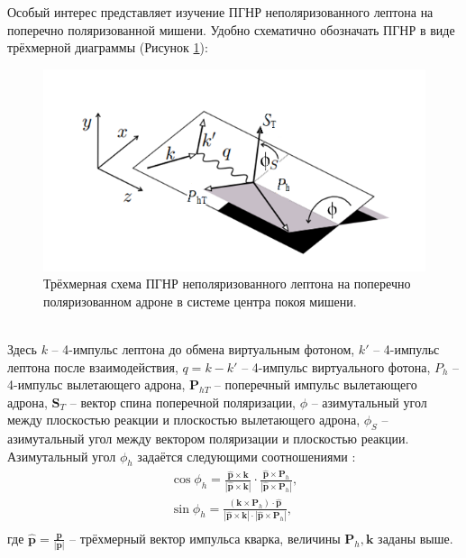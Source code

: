 \documentclass{extarticle}
\begin{document}
Особый интерес представляет изучение ПГНР неполяризованного лептона на поперечно поляризованной мишени. Удобно схематично обозначать ПГНР в виде трёхмерной диаграммы (Рисунок \ref{fig:sidis}):
\begin{figure}[h]
	\centering
	\includegraphics{sidis.png}
	\caption{Трёхмерная схема ПГНР неполяризованного лептона на поперечно поляризованном адроне в системе центра покоя мишени.}
	\label{fig:sidis}
\end{figure} \\
Здесь $k$ -- 4-импульс лептона до обмена виртуальным фотоном, $k'$ -- 4-импульс лептона после взаимодействия, $q = k-k'$ -- 4-импульс виртуального фотона, $P_h$ -- 4-импульс вылетающего адрона, $\textbf{P}_{hT}$ -- поперечный импульс вылетающего адрона, $\textbf{S}_T$ -- вектор спина поперечной поляризации, $\phi$ -- азимутальный угол между плоскостью реакции и плоскостью вылетающего адрона, $\phi_S$ -- азимутальный угол между вектором поляризации и плоскостью реакции. Азимутальный угол $\phi_h$ задаётся следующими соотношениями \cite{Bacchetta_2004}:
\begin{equation}
	\begin{split}
		\cos \phi_{h} = \frac{\hat{\textbf{p}} \times \textbf{k}}{|\hat{\textbf{p}} \times \textbf{k}|} \cdot \frac{\hat{\textbf{p}}\times \textbf{P}_h}{|\hat{\textbf{p}}\times \textbf{P}_h|}, \\
		\sin \phi_{h} = \frac{(\textbf{k}\times \textbf{P}_h)\cdot \hat{\textbf{p}}}{|\hat{\textbf{p}} \times \textbf{k}|\cdot|\hat{\textbf{p}}\times \textbf{P}_h|}, \\
	\end{split}
\end{equation}
где $\hat{\textbf{p}} = \frac{\textbf{p}}{|\textbf{p}|}$ -- трёхмерный вектор импульса кварка, величины $\textbf{P}_h, \textbf{k}$ заданы выше. 
\end{document}

